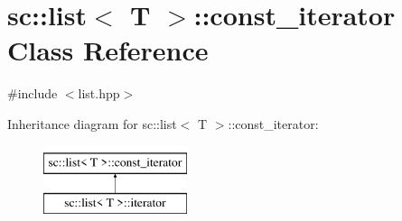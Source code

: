 \hypertarget{classsc_1_1list_1_1const__iterator}{}\section{sc\+:\+:list$<$ T $>$\+:\+:const\+\_\+iterator Class Reference}
\label{classsc_1_1list_1_1const__iterator}


{\ttfamily \#include $<$list.\+hpp$>$}

Inheritance diagram for sc\+:\+:list$<$ T $>$\+:\+:const\+\_\+iterator\+:\begin{figure}[H]
\begin{center}
\leavevmode
\includegraphics[height=2.000000cm]{classsc_1_1list_1_1const__iterator}
\end{center}
\end{figure}
